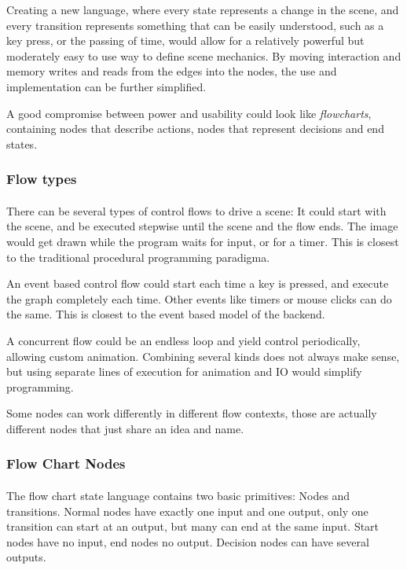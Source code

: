 Creating a new language, where every state represents a change in the scene, and every transition represents something that can be easily understood, such as a key press, or the passing of time, would allow for a relatively powerful but moderately easy to use way to define scene mechanics.
By moving interaction and memory writes and reads from the edges into the nodes, the use and implementation can be further simplified.

A good compromise between power and usability could look like \textit{flowcharts}, containing nodes that describe actions, nodes that represent decisions and end states.

\subsubsection{Flow types}
\paragraph{}
There can be several types of control flows to drive a scene:
It could start with the scene, and be executed stepwise until the scene and the flow ends.
The image would get drawn while the program waits for input, or for a timer.
This is closest to the traditional procedural programming paradigma.

An event based control flow could start each time a key is pressed, and execute the graph completely each time.
Other events like timers or mouse clicks can do the same.
This is closest to the event based model of the backend.

A concurrent flow could be an endless loop and yield control periodically, allowing custom animation.
Combining several kinds does not always make sense, but using separate lines of execution for animation and IO would simplify programming.

Some nodes can work differently in different flow contexts, those are actually different nodes that just share an idea and name.

\subsubsection{Flow Chart Nodes}
\paragraph{}
The flow chart state language contains two basic primitives: Nodes and transitions.
Normal nodes have exactly one input and one output, only one transition can start at an output, but many can end at the same input. Start nodes have no input, end nodes no output. Decision nodes can have several outputs.

